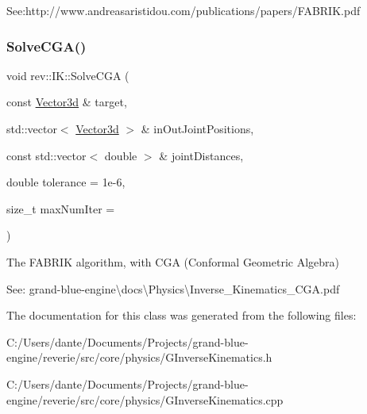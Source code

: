 See\+:http\+://www.andreasaristidou.\+com/publications/papers/\+F\+A\+B\+R\+IK.pdf \mbox{\label{classrev_1_1_i_k_a69121f5a0869f28cb3f6a7ea53acb4e1}} 
\subsubsection{\texorpdfstring{SolveCGA()}{SolveCGA()}}
{\footnotesize\ttfamily void rev\+::\+I\+K\+::\+Solve\+C\+GA (\begin{DoxyParamCaption}\item[{const \mbox{\hyperlink{classrev_1_1_vector}{Vector3d}} \&}]{target,  }\item[{std\+::vector$<$ \mbox{\hyperlink{classrev_1_1_vector}{Vector3d}} $>$ \&}]{in\+Out\+Joint\+Positions,  }\item[{const std\+::vector$<$ double $>$ \&}]{joint\+Distances,  }\item[{double}]{tolerance = {\ttfamily 1e-\/6},  }\item[{size\+\_\+t}]{max\+Num\+Iter = {} }\end{DoxyParamCaption})\hspace{0.3cm}{\ttfamily [static]}}



The F\+A\+B\+R\+IK algorithm, with C\+GA (Conformal Geometric Algebra) 

See\+: grand-\/blue-\/engine\textbackslash{}docs\textbackslash{}\+Physics\textbackslash{}\+Inverse\+\_\+\+Kinematics\+\_\+\+C\+G\+A.\+pdf 

The documentation for this class was generated from the following files\+:\begin{DoxyCompactItemize}
\item 
C\+:/\+Users/dante/\+Documents/\+Projects/grand-\/blue-\/engine/reverie/src/core/physics/G\+Inverse\+Kinematics.\+h\item 
C\+:/\+Users/dante/\+Documents/\+Projects/grand-\/blue-\/engine/reverie/src/core/physics/G\+Inverse\+Kinematics.\+cpp\end{DoxyCompactItemize}
